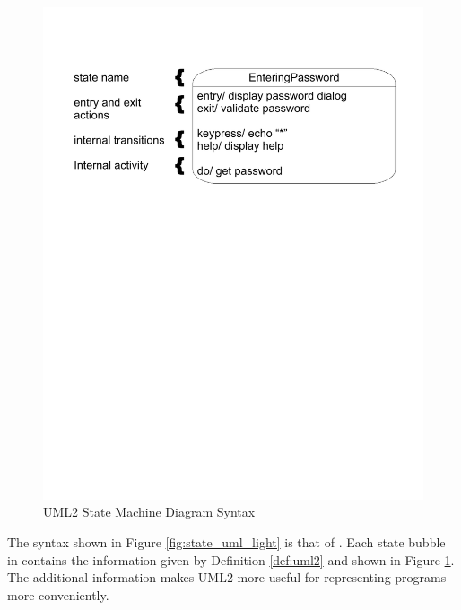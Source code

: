 \clearpage
\begin{figure}[htp]
    \centering
    \includegraphics[trim= 15mm 175mm 15mm 10mm, clip, width=\imgmedium]{./images/state_uml2_syntax_21_4.pdf} 
    \caption{UML2 State Machine Diagram Syntax\cite{UML2}}
    \label{fig:state_uml2}
\end{figure}

The syntax shown in Figure \ref{fig:state_uml_light} is that of \cite{UML2}. Each state bubble in   contains the information given by Definition \ref{def:uml2} and shown in Figure \ref{fig:state_uml2}. The additional information makes UML2 more useful for representing programs more conveniently.

